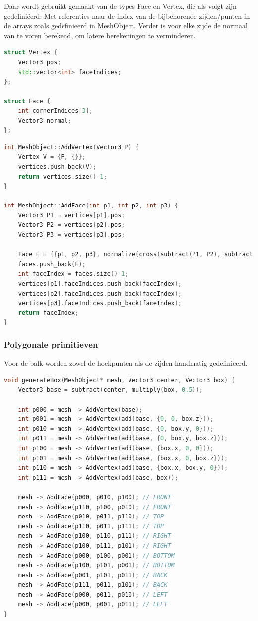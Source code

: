 \documentclass[12pt, a4paper]{article}
\begin{document}
Daar wordt gebruikt gemaakt van de types Face en Vertex, die als volgt zijn gedefiniëerd. Met referenties naar de index van de bijbehorende zijden/punten in de arrays zoals gedefinieerd in MeshObject. Verder is voor elke zijde de normaal van te voren berekend, om latere berekeningen te verminderen.

\begin{lstlisting}[language=c++]
struct Vertex {
	Vector3 pos;
	std::vector<int> faceIndices;
};

struct Face {
	int cornerIndices[3];
	Vector3 normal;
};
\end{lstlisting}

\begin{lstlisting}[language=c++]
int MeshObject::AddVertex(Vector3 P) {
	Vertex V = {P, {}};
	vertices.push_back(V);
	return vertices.size()-1;
}

int MeshObject::AddFace(int p1, int p2, int p3) {
	Vector3 P1 = vertices[p1].pos;
	Vector3 P2 = vertices[p2].pos;
	Vector3 P3 = vertices[p3].pos;
	
	Face F = {{p1, p2, p3}, normalize(cross(subtract(P1, P2), subtract(P1, P3)))};
	faces.push_back(F);
	int faceIndex = faces.size()-1;
	vertices[p1].faceIndices.push_back(faceIndex);
	vertices[p2].faceIndices.push_back(faceIndex);
	vertices[p3].faceIndices.push_back(faceIndex);
	return faceIndex;
}
\end{lstlisting}

\subsubsection{Polygonale primitieven}

Voor de balk worden zowel de hoekpunten als de zijden handmatig gedefinieerd.

\begin{lstlisting}[language=c++]
void generateBox(MeshObject* mesh, Vector3 center, Vector3 box) {
	Vector3 base = subtract(center, multiply(box, 0.5));
	
	int p000 = mesh -> AddVertex(base);
	int p001 = mesh -> AddVertex(add(base, {0, 0, box.z}));
	int p010 = mesh -> AddVertex(add(base, {0, box.y, 0}));
	int p011 = mesh -> AddVertex(add(base, {0, box.y, box.z}));
	int p100 = mesh -> AddVertex(add(base, {box.x, 0, 0}));
	int p101 = mesh -> AddVertex(add(base, {box.x, 0, box.z}));
	int p110 = mesh -> AddVertex(add(base, {box.x, box.y, 0}));
	int p111 = mesh -> AddVertex(add(base, box));
	
	mesh -> AddFace(p000, p010, p100); // FRONT
	mesh -> AddFace(p110, p100, p010); // FRONT
	mesh -> AddFace(p010, p011, p110); // TOP
	mesh -> AddFace(p110, p011, p111); // TOP
	mesh -> AddFace(p100, p110, p111); // RIGHT
	mesh -> AddFace(p100, p111, p101); // RIGHT
	mesh -> AddFace(p000, p100, p001); // BOTTOM
	mesh -> AddFace(p100, p101, p001); // BOTTOM
	mesh -> AddFace(p001, p101, p011); // BACK
	mesh -> AddFace(p111, p011, p101); // BACK
	mesh -> AddFace(p000, p011, p010); // LEFT
	mesh -> AddFace(p000, p001, p011); // LEFT
}
\end{lstlisting}
\end{document}
